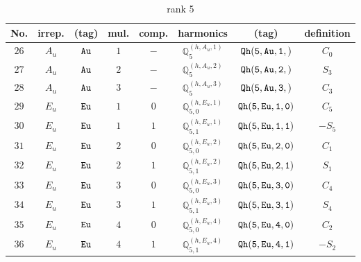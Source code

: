 \documentclass[fleqn,8pt]{jsarticle}
\begin{document}
\begin{table}[ht!]
\begin{center}
\caption{rank 5}
\renewcommand{\arraystretch}{1.3}
\begin{tabular}{cccccccc} \hline \hline
No. & irrep. & (tag) & mul. & comp. & harmonics & (tag) & definition \\ \hline
$ 26 $ & $ A_{u} $ & $ {\tt Au} $ & $ 1 $ & $ - $ & $ \mathbb{Q}_{5}^{(h,A_{u},1)} $ & $ {\tt Qh(5,Au,1,)} $ & $ C_{0} $ \\
$ 27 $ & $ A_{u} $ & $ {\tt Au} $ & $ 2 $ & $ - $ & $ \mathbb{Q}_{5}^{(h,A_{u},2)} $ & $ {\tt Qh(5,Au,2,)} $ & $ S_{3} $ \\
$ 28 $ & $ A_{u} $ & $ {\tt Au} $ & $ 3 $ & $ - $ & $ \mathbb{Q}_{5}^{(h,A_{u},3)} $ & $ {\tt Qh(5,Au,3,)} $ & $ C_{3} $ \\
$ 29 $ & $ E_{u} $ & $ {\tt Eu} $ & $ 1 $ & $ 0 $ & $ \mathbb{Q}_{5,0}^{(h,E_{u},1)} $ & $ {\tt Qh(5,Eu,1,0)} $ & $ C_{5} $ \\
$ 30 $ & $ E_{u} $ & $ {\tt Eu} $ & $ 1 $ & $ 1 $ & $ \mathbb{Q}_{5,1}^{(h,E_{u},1)} $ & $ {\tt Qh(5,Eu,1,1)} $ & $ - S_{5} $ \\
$ 31 $ & $ E_{u} $ & $ {\tt Eu} $ & $ 2 $ & $ 0 $ & $ \mathbb{Q}_{5,0}^{(h,E_{u},2)} $ & $ {\tt Qh(5,Eu,2,0)} $ & $ C_{1} $ \\
$ 32 $ & $ E_{u} $ & $ {\tt Eu} $ & $ 2 $ & $ 1 $ & $ \mathbb{Q}_{5,1}^{(h,E_{u},2)} $ & $ {\tt Qh(5,Eu,2,1)} $ & $ S_{1} $ \\
$ 33 $ & $ E_{u} $ & $ {\tt Eu} $ & $ 3 $ & $ 0 $ & $ \mathbb{Q}_{5,0}^{(h,E_{u},3)} $ & $ {\tt Qh(5,Eu,3,0)} $ & $ C_{4} $ \\
$ 34 $ & $ E_{u} $ & $ {\tt Eu} $ & $ 3 $ & $ 1 $ & $ \mathbb{Q}_{5,1}^{(h,E_{u},3)} $ & $ {\tt Qh(5,Eu,3,1)} $ & $ S_{4} $ \\
$ 35 $ & $ E_{u} $ & $ {\tt Eu} $ & $ 4 $ & $ 0 $ & $ \mathbb{Q}_{5,0}^{(h,E_{u},4)} $ & $ {\tt Qh(5,Eu,4,0)} $ & $ C_{2} $ \\
$ 36 $ & $ E_{u} $ & $ {\tt Eu} $ & $ 4 $ & $ 1 $ & $ \mathbb{Q}_{5,1}^{(h,E_{u},4)} $ & $ {\tt Qh(5,Eu,4,1)} $ & $ - S_{2} $ \\
 \hline \hline
\end{tabular}
\end{center}
\end{table}
\end{document}
